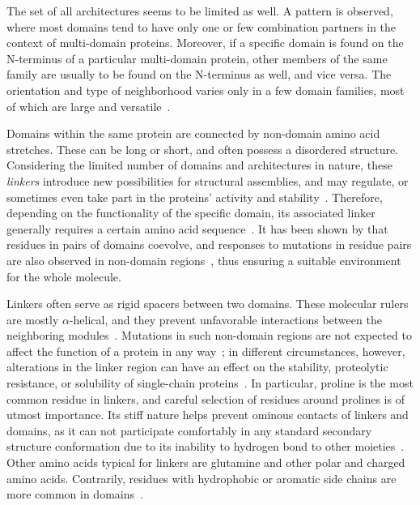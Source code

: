   The set of all architectures seems to be limited as well.
  A pattern is observed, where most domains tend to have only one or few
  combination partners in the context of multi-domain proteins.
  Moreover, if a specific domain is found on the N-terminus of a particular multi-domain
  protein, other members of the same family are usually to be found on the N-terminus as
  well, and vice versa.
  The orientation and type of neighborhood varies only in a few domain families, most of
  which are large and versatile~\cite{apic2001domain, apic2001insight}.

\label{intro:linker}

  Domains within the same protein are connected by non-domain amino acid stretches.
  These can be long or short, and often possess a disordered structure.
  Considering the limited number of domains and architectures in nature, these
  \emph{linkers} introduce new possibilities for structural assemblies, and may regulate,
  or sometimes even take part in the proteins' activity and
  stability~\cite{papaleo2016role}.
  Therefore, depending on the functionality of the specific domain, its associated linker
  generally requires a certain amino acid sequence~\cite{gokhale2000role}.
  It has been shown by \citet{jakubec2018widespread} that residues in pairs of domains
  coevolve, and responses to mutations in residue pairs are also observed in non-domain
  regions~\cite{smock2010interdomain}, thus ensuring a suitable environment for the whole
  molecule.

  Linkers often serve as rigid spacers between two domains.
  These molecular rulers are mostly $\alpha$-helical, and they prevent unfavorable
  interactions between the neighboring
  modules~\cite{george2002analysis, wriggers2005control}.
  Mutations in such non-domain regions are not expected to affect the function of a
  protein in any way~\cite{bottema1991missense}; in different circumstances, however,
  alterations in the linker region can have an effect on the stability, proteolytic
  resistance, or solubility of single-chain proteins~\cite{robinson1998optimizing}.
  In particular, proline is the most common residue in linkers, and careful selection of residues around prolines is of utmost importance.
  Its stiff nature helps prevent ominous contacts of linkers and domains, as it can not
  participate comfortably in any standard secondary structure conformation due to its
  inability to hydrogen bond to other
  moieties~\cite{george2002analysis, wriggers2005control}.
  Other amino acids typical for linkers are glutamine and other polar and charged
  amino acids.
  Contrarily, residues with hydrophobic or aromatic side chains are more common in
  domains~\cite{brune2018proteome}.

